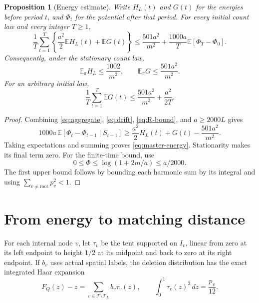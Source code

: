\documentclass[11pt]{article}
\numberwithin{equation}{section}
\newtheorem{proposition}[theorem]{Proposition}
\theoremstyle{remark}
\newcommand{\E}{\mathbb E}
\newcommand{\T}{\mathcal T}
\begin{document}
\begin{proposition}[Energy estimate]\label{prop:energy}
Write \(H_L(t)\) and \(G(t)\) for the energies before period \(t\), and \(\Phi_t\) for the potential after that period. For every initial count law and every integer $T\ge1$,
\begin{equation}\label{eq:master-energy}
 \frac1T\sum_{t=1}^T
 \left\{\frac{a^2}{2}\E H_L(t)+\E G(t)\right\}
 \le \frac{501a^2}{m^2}
       +\frac{1000a}{T}\E[\Phi_T-\Phi_0].
\end{equation}
Consequently, under the stationary count law,
\begin{equation}\label{eq:stationary-energy}
 \E_\pi H_L\le\frac{1002}{m^2},\qquad
 \E_\pi G\le\frac{501a^2}{m^2}.
\end{equation}
For an arbitrary initial law,
\begin{equation}\label{eq:finite-G}
 \frac1T\sum_{t=1}^T\E G(t)
 \le\frac{501a^2}{m^2}+\frac{a^2}{2T}.
\end{equation}
\end{proposition}
\begin{proof}
Combining \eqref{eq:aggregate}, \eqref{eq:drift}, \eqref{eq:R-bound}, and $a\ge2000L$ gives
\[
 1000a\,\E[\Phi_{t}-\Phi_{t-1}\mid S_{t-1}]
 \ge\frac{a^2}{2}H_L(t)+G(t)-\frac{501a^2}{m^2}.
\]
Taking expectations and summing proves \eqref{eq:master-energy}.
Stationarity makes its final term zero. For the finite-time bound, use
\[
 0\le\Phi\le\log(1+2m/a)\le a/2000.
\]
The first upper bound follows by bounding each harmonic sum by its integral
and using $\sum_{v\ne\mathrm{root}}p_v^2<1$.
\end{proof}


\section{From energy to matching distance}\label{sec:transport}

For each internal node \(v\), let \(\tau_v\) be the tent supported on
\(I_v\), linear from zero at its left endpoint to height \(1/2\) at its
midpoint and back to zero at its right endpoint. If \(b_v\) uses actual
spatial labels, the deletion distribution has the exact integrated Haar
expansion
\begin{equation}\label{eq:Haar}
F_Q(z)-z=\sum_{v\in\T\setminus\T_L}b_v\tau_v(z),
\qquad
\int_0^1\tau_v(z)^2\,dz=\frac{p_v}{12}.
\end{equation}
\end{document}
